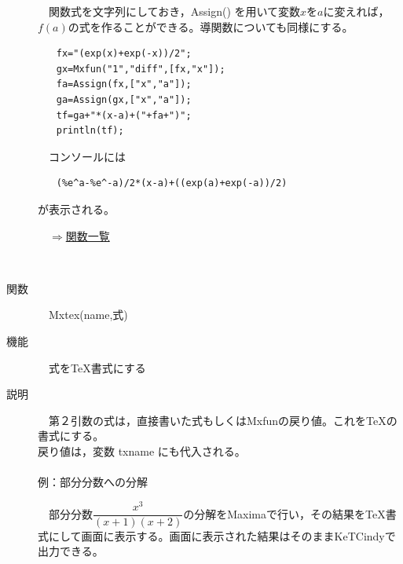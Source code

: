 \documentclass[papersize,a4paper,12pt,uplatex]{jsarticle}
\begin{document}
\begin{description}
　関数式を文字列にしておき，Assign() を用いて変数$x$を$a$に変えれば，$f(a)$の式を作ることができる。導関数についても同様にする。\\
\begin{verbatim}
　　fx="(exp(x)+exp(-x))/2";
　　gx=Mxfun("1","diff",[fx,"x"]);
　　fa=Assign(fx,["x","a"]);
　　ga=Assign(gx,["x","a"]);
　　tf=ga+"*(x-a)+("+fa+")";
　　println(tf);
\end{verbatim}
　コンソールには
\begin{verbatim}
　　(%e^a-%e^-a)/2*(x-a)+((exp(a)+exp(-a))/2) 
\end{verbatim}
が表示される。\\
\begin{flushright}　\hyperlink{functionlist}{$\Rightarrow$関数一覧}\end{flushright}
　\\

\hypertarget{mxtex}{}
\item[関数]　Mxtex(name,式)
\item[機能]　式をTeX書式にする
\item[説明]　第２引数の式は，直接書いた式もしくはMxfunの戻り値。これをTeXの書式にする。\\
戻り値は，変数 txname にも代入される。\\
　\\
例：部分分数への分解
\begin{spacing}{1.5}
　部分分数$\dfrac{x^3}{(x+1)(x+2)}$の分解をMaximaで行い，その結果をTeX書式にして画面に表示する。画面に表示された結果はそのままKeTCindyで出力できる。
\end{spacing}


\end{description}
\end{document}
